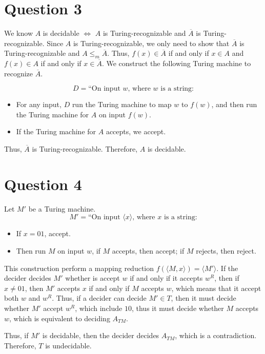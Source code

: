 \documentclass[a4paper, UTF-8]{article}
\theoremstyle{plain}
\begin{document}
\section{Question 3} 

We know $A$ is decidable $\iff$ $A$ is Turing-recognizable and $\overline{A}$ is Turing-recognizable. Since $A$ is Turing-recognizable, we only need to show that $\overline{A}$ is Turing-recognizable and $A \leq_{m} \overline{A}$. Thus, $f(x) \in \overline{A}$ if and only if $x \in A$ and $f(x) \in A$ if and only if $x \in \overline{A}$. We construct the following Turing machine to recognize $\overline{A}$.

$$
D = \text{``On input } w\text{, where } w \text{ is a string:}
$$

\begin{itemize}
  \item For any input, $D$ run the Turing machine to map $w$ to $f(w)$, and then run the Turing machine for $A$ on input $f(w)$.
  \item If the Turing machine for $A$ accepts, we accept. 
\end{itemize}

Thus, $\overline{A}$ is Turing-recognizable. Therefore, $A$ is decidable.

\section{Question 4} 

Let $M'$ be a Turing machine. 
$$
M' = \text{``On input } \langle x \rangle\text{, where } x \text{ is a string:}
$$

\begin{itemize}
  \item If $x = 01$, accept.
  \item Then run $M$ on input $w$, if $M$ accepts, then accept; if $M$ rejects, then reject.
\end{itemize}

This construction perform a mapping reduction $f(\langle M, x \rangle) = \langle M' \rangle$. If the decider decides $M'$ whether is accept $w$ if and only if it accepts $w^{R}$, then if $x \ne 01$, then $M'$ accepts $x$ if and only if $M$ accepts $w$, which means that it accept both $w$ and $w^{R}$. Thus, if a decider can decide $M' \in T$, then it must decide whether $M'$ accept $w^{R}$, which include $10$, thus it must decide whether $M$ accepts $w$, which is equivalent to deciding $A_{TM}$.  

Thus, if $M'$ is decidable, then the decider decides $A_{TM}$, which is a contradiction. Therefore, $T$ is undecidable.
\end{document}
